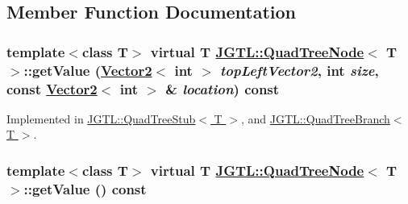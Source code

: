 \subsection{Member Function Documentation}
\hypertarget{class_j_g_t_l_1_1_quad_tree_node_bc249b527b146888c21dac71783f42b6}{
\subsubsection[getValue]{\setlength{\rightskip}{0pt plus 5cm}template$<$class T$>$ virtual T \hyperlink{class_j_g_t_l_1_1_quad_tree_node}{JGTL::Quad\-Tree\-Node}$<$ T $>$::get\-Value (\hyperlink{class_j_g_t_l_1_1_vector2}{Vector2}$<$ int $>$ {\em top\-Left\-Vector2}, int {\em size}, const \hyperlink{class_j_g_t_l_1_1_vector2}{Vector2}$<$ int $>$ \& {\em location}) const}}
\label{class_j_g_t_l_1_1_quad_tree_node_bc249b527b146888c21dac71783f42b6}




Implemented in \hyperlink{class_j_g_t_l_1_1_quad_tree_stub_99e89a45f21e503a1cef13f54a8ef65b}{JGTL::Quad\-Tree\-Stub$<$ T $>$}, and \hyperlink{class_j_g_t_l_1_1_quad_tree_branch_4354d8a11f9092f3f189f0eef4d2ffff}{JGTL::Quad\-Tree\-Branch$<$ T $>$}.\hypertarget{class_j_g_t_l_1_1_quad_tree_node_b92e9755284317f2d8102f028b0481c7}{
\subsubsection[getValue]{\setlength{\rightskip}{0pt plus 5cm}template$<$class T$>$ virtual T \hyperlink{class_j_g_t_l_1_1_quad_tree_node}{JGTL::Quad\-Tree\-Node}$<$ T $>$::get\-Value () const}}
\label{class_j_g_t_l_1_1_quad_tree_node_b92e9755284317f2d8102f028b0481c7}




